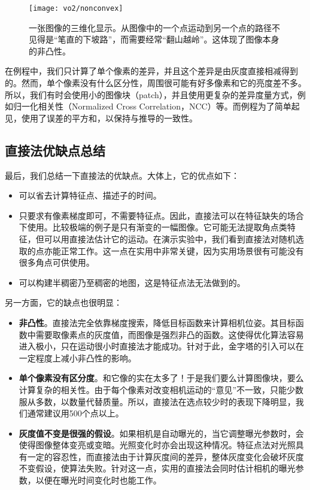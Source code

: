 \begin{figure}[!htp]
	\centering
	\texttt{[image: vo2/nonconvex]}
	\caption{一张图像的三维化显示。从图像中的一个点运动到另一个点的路径不见得是“笔直的下坡路”，而需要经常“翻山越岭”。这体现了图像本身的非凸性。}
	\label{fig:non-convex}
\end{figure}

在例程中，我们只计算了单个像素的差异，并且这个差异是由灰度直接相减得到的。然而，单个像素没有什么区分性，周围很可能有好多像素和它的亮度差不多。所以，我们有时会使用小的图像块（patch），并且使用更复杂的差异度量方式，例如归一化相关性（Normalized Cross Correlation，NCC）等。而例程为了简单起见，使用了误差的平方和，以保持与推导的一致性。

\subsection{直接法优缺点总结}
最后，我们总结一下直接法的优缺点。大体上，它的优点如下：

\begin{itemize}
	\item 可以省去计算特征点、描述子的时间。
	\item 只要求有像素梯度即可，不需要特征点。因此，直接法可以在特征缺失的场合下使用。比较极端的例子是只有渐变的一幅图像。它可能无法提取角点类特征，但可以用直接法估计它的运动。在演示实验中，我们看到直接法对随机选取的点亦能正常工作。这一点在实用中非常关键，因为实用场景很有可能没有很多角点可供使用。
	\item 可以构建半稠密乃至稠密的地图，这是特征点法无法做到的。
\end{itemize}

另一方面，它的缺点也很明显：
\begin{itemize}
	\item \textbf{非凸性}。直接法完全依靠梯度搜索，降低目标函数来计算相机位姿。其目标函数中需要取像素点的灰度值，而图像是强烈非凸的函数。这使得优化算法容易进入极小，只在运动很小时直接法才能成功。针对于此，金字塔的引入可以在一定程度上减小非凸性的影响。
	\item \textbf{单个像素没有区分度}。和它像的实在太多了！于是我们要么计算图像块，要么计算复杂的相关性。由于每个像素对改变相机运动的“意见”不一致，只能少数服从多数，以数量代替质量。所以，直接法在选点较少时的表现下降明显，我们通常建议用500个点以上。
	\item \textbf{灰度值不变是很强的假设}。如果相机是自动曝光的，当它调整曝光参数时，会使得图像整体变亮或变暗。光照变化时亦会出现这种情况。特征点法对光照具有一定的容忍性，而直接法由于计算灰度间的差异，整体灰度变化会破坏灰度不变假设，使算法失败。针对这一点，实用的直接法会同时估计相机的曝光参数\cite{Engel2016}，以便在曝光时间变化时也能工作。
\end{itemize}

